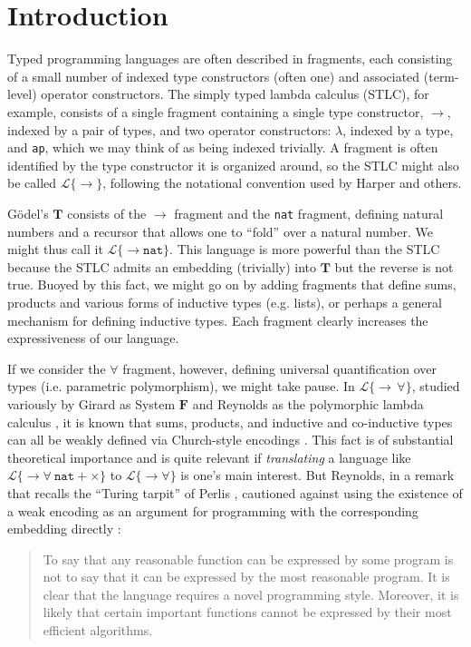 \documentclass[9pt,preprint]{sigplanconf}
\begin{document}
\section{Introduction}
Typed programming languages are often described in fragments, each consisting of a small number of indexed type constructors (often one) and associated (term-level) operator constructors. The simply typed lambda calculus (STLC), for example, consists of a single fragment containing a single type constructor, $\rightarrow$, indexed by a pair of types, and two operator constructors: $\lambda$, indexed by a type, and \verb|ap|, which we may think of as being indexed trivially. A fragment is often identified by the type constructor it is organized around, so the STLC might also be called $\mathcal{L}\{\rightarrow\}$, following the notational convention used by Harper \cite{pfpl} and others.

G\"odel's $\mathbf{T}$ consists of the $\rightarrow$ fragment and the \verb|nat| fragment, defining natural numbers and a recursor that allows one to ``fold'' over a natural number. We might thus call it $\mathcal{L}\{\rightarrow \mathtt{nat}\}$. This language is  more powerful than the STLC because the STLC admits an embedding (trivially) into  $\mathbf{T}$ but the reverse is not true. Buoyed by this fact, we might go on by adding fragments that define sums, products and various forms of inductive types (e.g. lists), or perhaps a general mechanism for defining inductive types. Each fragment clearly increases the expressiveness of our language.

If we consider the $\forall$ fragment, however, defining universal quantification over types (i.e. parametric polymorphism), we might take pause. In $\mathcal{L}\{\rightarrow\,\forall\}$, studied variously by Girard as System $\mathbf{F}$ \cite{girardF} and Reynolds as the polymorphic lambda calculus \cite{polylam}, it is known that sums, products, and inductive and co-inductive types can all be weakly defined via Church-style encodings \cite{reynolds}. This fact is of substantial theoretical importance and is quite relevant if \emph{translating} a language like $\mathcal{L}\{\rightarrow\forall~\mathtt{nat} + \times\}$ to $\mathcal{L}\{\rightarrow\forall\}$ is one's main interest. But Reynolds, in a remark that recalls the ``Turing tarpit'' of Perlis \cite{Perl82a}, cautioned against using the existence of a weak encoding as an argument for programming with the corresponding embedding directly \cite{Reynolds94anintroduction}: 
\begin{quote}
To say that any reasonable function can be expressed by some program is not to say that it can be expressed by the most reasonable program. It is clear that the language requires a novel programming style. Moreover, it is likely that certain important functions cannot be expressed by their most efficient algorithms.
\end{quote}
\end{document}
